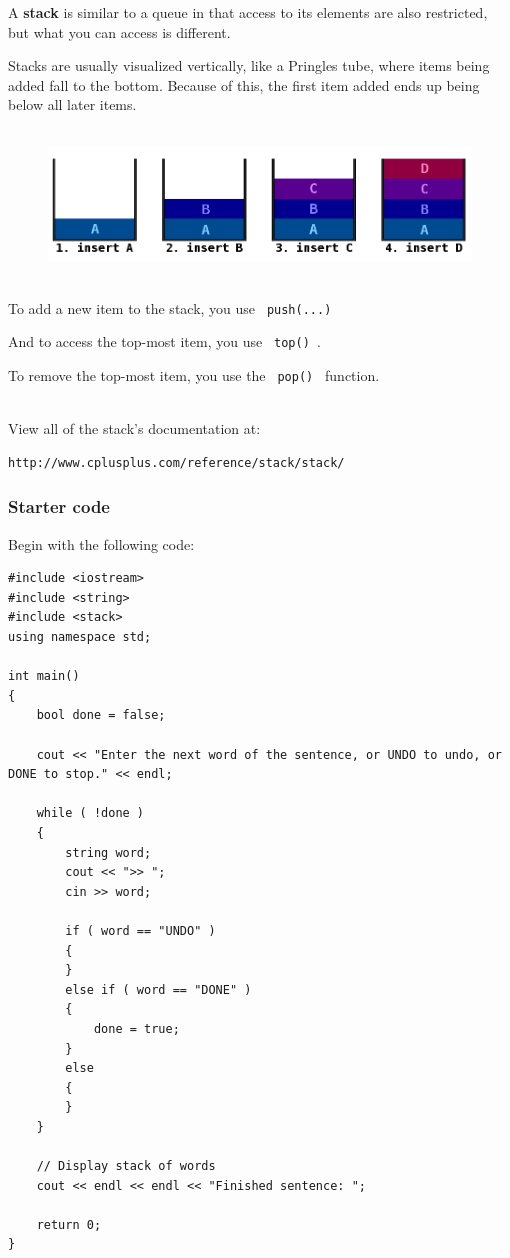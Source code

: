 \documentclass[a4paper,12pt]{book}
\begin{document}
            
                A \textbf{ stack } is similar to a queue in that
                access to its elements are also restricted,
                but what you can access is different.

                Stacks are usually visualized vertically, like a
                Pringles tube, where items being added fall to the bottom.
                Because of this, the first item added ends up being
                below all later items. ~\\

                \begin{figure}[h]
                    \centering
                    \includegraphics[height=4cm]{lab01-stacks.png}
                \end{figure}
                
                To add a new item to the stack, you use \texttt{ push(...) } 

                And to access the top-most item, you use \texttt{ top() }.
                
                To remove the top-most item, you use the \texttt{ pop() } function. 

                ~\\ View all of the stack's documentation at:
\begin{verbatim}
http://www.cplusplus.com/reference/stack/stack/
\end{verbatim}

                \hrulefill{}
                \subsubsection*{ Starter code }
                    Begin with the following code:

\begin{lstlisting}[style=code]
#include <iostream>
#include <string>
#include <stack>
using namespace std;

int main()
{    
    bool done = false;

    cout << "Enter the next word of the sentence, or UNDO to undo, or DONE to stop." << endl;

    while ( !done )
    {
        string word;
        cout << ">> ";
        cin >> word;

        if ( word == "UNDO" )
        {
        }
        else if ( word == "DONE" )
        {
            done = true;
        }
        else
        {
        }
    }

    // Display stack of words
    cout << endl << endl << "Finished sentence: ";
    
    return 0;
}

\end{lstlisting}
\end{document}
